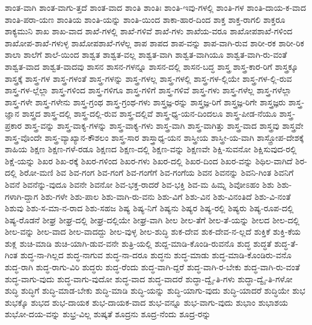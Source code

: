 {ಶಾಂತ-ವಾಗಿ
ಶಾಂತ-ವಾಗು-ತ್ತದೆ
ಶಾಂತ-ವಾದ
ಶಾಂತಿ
ಶಾಂತಿಃ
ಶಾಂತಿ-ಇವು-ಗಳಲ್ಲಿ
ಶಾಂತಿ-ಗಳ
ಶಾಂತಿ-ದಾಯ-ಕ-ವಾದ
ಶಾಂತಿ-ಪರಾ-ಯಣ
ಶಾಂತಿಯ
ಶಾಂತಿ-ಯನ್ನು
ಶಾಂತಿ-ಯಿಂದ
ಶಾಕಾ-ಹಾರ-ದಿಂದ
ಶಾಕ್ತ
ಶಾಕ್ತ-ರಾಗಲಿ
ಶಾಕ್ತರೂ
ಶಾಕ್ಯಮುನಿ
ಶಾಖ
ಶಾಖ-ವಾದ
ಶಾಖೆ-ಗಳಲ್ಲಿ
ಶಾಖೆ-ಗಳಿವೆ
ಶಾಖೆ-ಗಳು
ಶಾಖೆಯ-ವರೂ
ಶಾಖೋಪಶಾಖೆ-ಗಳಿಂದ
ಶಾಖೋಪ-ಶಾಖೆ-ಗಳುಳ್ಳ
ಶಾಖೋಪಶಾಖೆ-ಗಳೆಲ್ಲ
ಶಾಪ
ಶಾಪದ
ಶಾಪ-ವನ್ನು
ಶಾಪ-ವಾಗಿ-ರುವ
ಶಾರೀ-ರಕ
ಶಾರೀ-ರಿಕ
ಶಾಲಾ
ಶಾಲೆಗೆ
ಶಾಲೆ-ಯಿಂದ
ಶಾಶ್ವತ
ಶಾಶ್ವತ-ವಲ್ಲ
ಶಾಶ್ವತ-ವಾಗಿ
ಶಾಶ್ವತ-ವಾಗಿಯೂ
ಶಾಶ್ವತ-ವಾಗಿ-ರು-ವಂತೆ
ಶಾಶ್ವತ-ವಾದ
ಶಾಶ್ವತ-ವಾದವು
ಶಾಸನ
ಶಾಸನ-ಗಳನ್ನೂ
ಶಾಸನ-ದಲ್ಲಿ
ಶಾಸನ-ಬದ್ಧ
ಶಾಸ್ತ್ರ
ಶಾಸ್ತ್ರ-ಕಾರ-ರಿಗೆ
ಶಾಸ್ತ್ರಕ್ಕೂ
ಶಾಸ್ತ್ರಕ್ಕೆ
ಶಾಸ್ತ್ರ-ಗಳ
ಶಾಸ್ತ್ರ-ಗಳಂತೆ
ಶಾಸ್ತ್ರ-ಗಳನ್ನು
ಶಾಸ್ತ್ರ-ಗಳಲ್ಲ
ಶಾಸ್ತ್ರ-ಗಳಲ್ಲಿ
ಶಾಸ್ತ್ರ-ಗಳ-ಲ್ಲಿಯೇ
ಶಾಸ್ತ್ರ-ಗಳ-ಲ್ಲಿ-ರುವ
ಶಾಸ್ತ್ರ-ಗಳ-ಲ್ಲೆಲ್ಲಾ
ಶಾಸ್ತ್ರ-ಗಳಿಂದ
ಶಾಸ್ತ್ರ-ಗಳಿಗೂ
ಶಾಸ್ತ್ರ-ಗಳಿಗೆ
ಶಾಸ್ತ್ರ-ಗಳಿವೆ
ಶಾಸ್ತ್ರ-ಗಳು
ಶಾಸ್ತ್ರ-ಗಳೆಲ್ಲ
ಶಾಸ್ತ್ರ-ಗಳೆಲ್ಲಾ
ಶಾಸ್ತ್ರ-ಗಳೇ
ಶಾಸ್ತ್ರ-ಗಳೇನು
ಶಾಸ್ತ್ರ-ಗ್ರಂಥ
ಶಾಸ್ತ್ರ-ಗ್ರಂಥ-ಗಳು
ಶಾಸ್ತ್ರಜ್ಞ-ರನ್ನು
ಶಾಸ್ತ್ರಜ್ಞ-ರಿಗೆ
ಶಾಸ್ತ್ರಜ್ಞ-ರಿಗೇ
ಶಾಸ್ತ್ರಜ್ಞರು
ಶಾಸ್ತ್ರ-ಜ್ಞಾನ
ಶಾಸ್ತ್ರದ
ಶಾಸ್ತ್ರ-ದಲ್ಲಿ
ಶಾಸ್ತ್ರ-ದಲ್ಲಿ-ರುವ
ಶಾಸ್ತ್ರ-ದಲ್ಲಿವೆ
ಶಾಸ್ತ್ರ-ಧ್ಯ-ಯನ-ದಿಂದಲೂ
ಶಾಸ್ತ್ರ-ಪೀಡ-ನೆಯೂ
ಶಾಸ್ತ್ರ-ಪ್ರಕಾರ
ಶಾಸ್ತ್ರ-ವನ್ನು
ಶಾಸ್ತ್ರ-ವಾಕ್ಯ-ಗಳನ್ನು
ಶಾಸ್ತ್ರ-ವಾಕ್ಯ-ಗಳು
ಶಾಸ್ತ್ರ-ವಾಗಿ
ಶಾಸ್ತ್ರ-ವಾಗಿತ್ತು
ಶಾಸ್ತ್ರ-ವಾದ
ಶಾಸ್ತ್ರವು
ಶಾಸ್ತ್ರವೇ
ಶಾಸ್ತ್ರ-ವೊಂದೇ
ಶಾಸ್ತ್ರ-ವ್ಯಾಖ್ಯಾನ-ಕೌಶಲಂ
ಶಾಸ್ತ್ರ-ಸಾರ
ಶಾಸ್ತ್ರಾಧ್ಯ-ಯನ
ಶಾಸ್ತ್ರೀಯ
ಶಾಸ್ತ್ರೀ-ಯ-ವಾಗಿ
ಶಾಸ್ತ್ರೋಪ-ದೇಶಕ್ಕೆ
ಶಾಹಿಯ
ಶಿಕ್ಷಣ
ಶಿಕ್ಷಣ-ಗಳೆ-ರಡೂ
ಶಿಕ್ಷಣದ
ಶಿಕ್ಷಣ-ದಲ್ಲಿ
ಶಿಕ್ಷಣ-ವನ್ನು
ಶಿಕ್ಷಣವೇ
ಶಿಕ್ಷಿ-ಸುವನೋ
ಶಿಕ್ಷಿಸುವುದ-ರಲ್ಲಿ
ಶಿಕ್ಷೆ-ಯನ್ನು
ಶಿಖರ
ಶಿಖ-ರಕ್ಕೆ
ಶಿಖರ-ಗಳಿಂದ
ಶಿಖರ-ಗಳು
ಶಿಖರ-ದಲ್ಲಿ
ಶಿಖರ-ದಿಂದ
ಶಿಖರ-ವನ್ನು
ಶಿಥಿಲ-ವಾಗಿದೆ
ಶಿರ-ದಲ್ಲಿ
ಶಿರೋ-ಮಣಿ
ಶಿವ
ಶಿವ-ಗಂಗ
ಶಿವ-ಗಂಗೆ
ಶಿವ-ಗಂಗೆಗೆ
ಶಿವ-ಗಂಗೆಯ
ಶಿವನ
ಶಿವನನ್ನು
ಶಿವನಿ-ಗಿಂತ
ಶಿವನಿಗೆ
ಶಿವನೆ
ಶಿವನೆನ್ನು-ವುದೂ
ಶಿವನೇ
ಶಿವನೋ
ಶಿವ-ಭಕ್ತ-ರಾದರೆ
ಶಿವ-ಭಕ್ತಿ
ಶಿವ-ಮ	ಹಿಮ್ನ
ಶಿವೋಽಹಂ
ಶಿಶು
ಶಿಶು-ಗಳಾಗಿ-ದ್ದಾಗ
ಶಿಶು-ಗಳೇ
ಶಿಶು-ಪಾಲ
ಶಿಶು-ವಾಗಿ-ರು-ವನು
ಶಿಶು-ವಿಗೆ
ಶಿಶು-ವಿನ
ಶಿಶು-ವಿನಂತಿದೆ
ಶಿಶು-ವಿ-ನಂತೆ
ಶಿಶುವು
ಶಿಶು-ಸ-ಮಾ-ನ-ರಾದ
ಶಿಶು-ಸಹಜ
ಶಿಷ್ಯ
ಶಿಷ್ಯ-ನಿಗೆ
ಶಿಷ್ಯನು
ಶಿಷ್ಯರ
ಶಿಷ್ಯ-ರಲ್ಲಿ
ಶಿಷ್ಯರು
ಶಿಷ್ಯ-ರೂಪ-ದಲ್ಲಿ
ಶಿಷ್ಯ-ರೊಡನೆ
ಶೀಘ್ರ
ಶೀಘ್ರ-ದಲ್ಲಿ
ಶೀಘ್ರ-ದಲ್ಲಿಯೇ
ಶೀಘ್ರ-ವಾಗಿ
ಶೀಲ
ಶೀಲ-ತೆಗೆ
ಶೀಲ-ತೆ-ಯನ್ನು
ಶೀಲದ
ಶೀಲ-ದಲ್ಲಿ
ಶೀಲ-ವನ್ನು
ಶೀಲ-ವಾದ
ಶೀಲ-ವಾದದ್ದು
ಶೀಲ-ವುಳ್ಳ
ಶೀಲ-ಶುದ್ಧಿ
ಶುಕ-ದೇವ
ಶುಕ-ದೇವ-ನ-ಲ್ಲದೆ
ಶುಕ್ತಿಕೆ
ಶುಕ್ತಿ-ಕೆಯ
ಶುಕ್ಲ
ಶುಚಿ-ಮಾಡಿ
ಶುಚಿ-ಯಾಗಿ-ಡುವ-ವನೇ
ಶುತ್ರಿ-ಯಲ್ಲಿ
ಶುದ್ದ-ಮಾಡಿ-ಕೊಂಡಿ-ರುವನೊ
ಶುದ್ಧ
ಶುದ್ಧತೆ
ಶುದ್ಧ-ತೆ-ಗಿಂತ
ಶುದ್ಧ-ನಾ-ಗಿಲ್ಲದ
ಶುದ್ಧ-ನಾಗುವ
ಶುದ್ಧ-ನಾ-ದರೂ
ಶುದ್ಧನು
ಶುದ್ಧ-ಮಾಡು
ಶುದ್ಧ-ಮಾಡಿ-ಕೊಂಡಿರು-ವನೊ
ಶುದ್ಧ-ರಾಗಿ
ಶುದ್ಧ-ರಾಗು-ವಿರಿ
ಶುದ್ಧರು
ಶುದ್ಧ-ರೆಂದು
ಶುದ್ಧ-ವಾಗಿ-ದ್ದರೆ
ಶುದ್ಧ-ವಾಗಿ-ರ-ಬೇಕು
ಶುದ್ಧ-ವಾಗಿ-ರು-ವಂತೆ
ಶುದ್ಧ-ವಾಗು-ವುದು
ಶುದ್ಧ-ವಾಗು-ವುದೋ
ಶುದ್ಧ-ವಾದ
ಶುದ್ಧ-ವಾದರೆ
ಶುದ್ಧಾ-ದ್ವೈ-ತಿ-ಗಳು
ಶುದ್ಧಾ-ದ್ವೈ-ತಿ-ಗಳೋ
ಶುದ್ಧಿ
ಶುದ್ಧಿಗೆ
ಶುದ್ಧಿ-ಮಾಡ-ಬೇಕು
ಶುದ್ಧಿ-ಮಾಡಿ
ಶುದ್ಧಿ-ಯನ್ನು
ಶುದ್ಧಿ-ಯಾಗು-ವುದು
ಶುದ್ಧಿ-ಯಾದರೆ
ಶುದ್ಧಿಯೇ
ಶುಭ
ಶುಭಕ್ಕೊ
ಶುಭದ
ಶುಭ-ದಾಯಕ
ಶುಭ-ದಾಯಕ-ವಾದ
ಶುಭ-ವನ್ನೂ
ಶುಭ-ವಾಗು-ವುದು
ಶುಭಾಂ
ಶುಭಾಶಯ
ಶುಭೋ-ದಯ-ವನ್ನು
ಶುಭ್ರ-ವಿಲ್ಲ
ಶುಷ್ಕತೆ
ಶೂದ್ರನು
ಶೂದ್ರ-ನೆಂದು
ಶೂದ್ರ-ರನ್ನು
}
